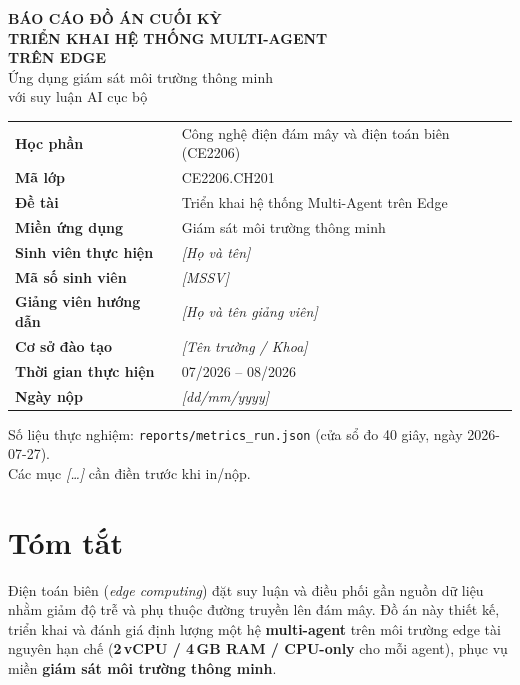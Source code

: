 \documentclass[12pt,a4paper,oneside]{report}
\newcommand{\code}[1]{\texttt{#1}}
\newcommand{\placeholder}[1]{\textit{[#1]}}
\begin{document}
\begin{titlepage}
  \centering
  {\large \textbf{BÁO CÁO ĐỒ ÁN CUỐI KỲ}}\\[1.5em]
  {\LARGE \textbf{TRIỂN KHAI HỆ THỐNG MULTI-AGENT\\TRÊN EDGE}}\\[0.8em]
  {\large Ứng dụng giám sát môi trường thông minh\\với suy luận AI cục bộ}\\[2em]

  \begin{tabular}{@{}ll@{}}
    \textbf{Học phần} & Công nghệ điện đám mây và điện toán biên (CE2206) \\
    \textbf{Mã lớp} & CE2206.CH201 \\
    \textbf{Đề tài} & Triển khai hệ thống Multi-Agent trên Edge \\
    \textbf{Miền ứng dụng} & Giám sát môi trường thông minh \\[0.6em]
    \textbf{Sinh viên thực hiện} & \placeholder{Họ và tên} \\
    \textbf{Mã số sinh viên} & \placeholder{MSSV} \\
    \textbf{Giảng viên hướng dẫn} & \placeholder{Họ và tên giảng viên} \\
    \textbf{Cơ sở đào tạo} & \placeholder{Tên trường / Khoa} \\[0.6em]
    \textbf{Thời gian thực hiện} & 07/2026 -- 08/2026 \\
    \textbf{Ngày nộp} & \placeholder{dd/mm/yyyy} \\
  \end{tabular}

  \vfill
  {\small Số liệu thực nghiệm: \code{reports/metrics\_run.json}
  (cửa sổ đo 40 giây, ngày 2026-07-27).\\
  Các mục \placeholder{\ldots} cần điền trước khi in/nộp.}
\end{titlepage}
\newpage
\chapter*{Tóm tắt}

Điện toán biên (\textit{edge computing}) đặt suy luận và điều phối gần nguồn dữ liệu nhằm giảm độ trễ và phụ thuộc đường truyền lên đám mây. Đồ án này thiết kế, triển khai và đánh giá định lượng một hệ \textbf{multi-agent} trên môi trường edge tài nguyên hạn chế (\textbf{2\,vCPU / 4\,GB RAM / CPU-only} cho mỗi agent), phục vụ miền \textbf{giám sát môi trường thông minh}.
\end{document}

